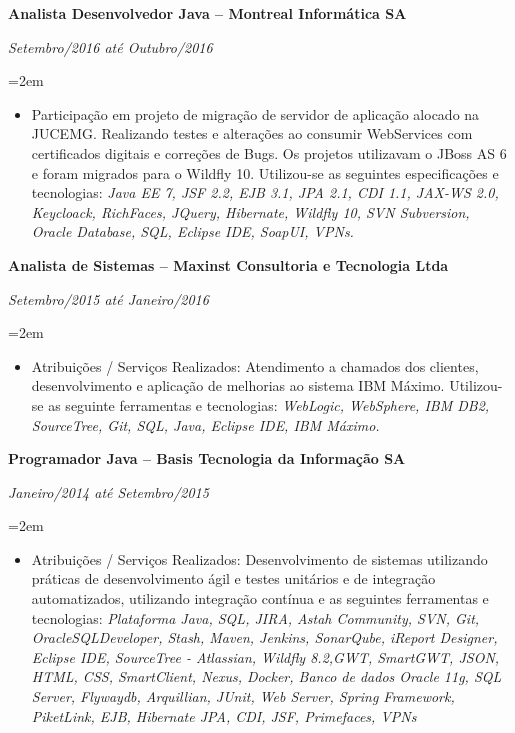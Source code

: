 \documentclass[paper=a4,fontsize=11pt]{scrartcl} %
\newcommand{\EducationEntry}[4]{
		\noindent \textbf{#1} \hfill      %
		\colorbox{White}{%
			\parbox{5cm}{%
			\hfill\color{Black}#2}} \par  %
		\noindent \textit{#3} \par        %
		\noindent\hangindent=2em\hangafter=0 \small #4 %
		\normalsize \par}
\begin{document}
\EducationEntry{Analista Desenvolvedor Java – Montreal Informática SA}{}{Setembro/2016 até Outubro/2016}{
	\begin{itemize}
		\item{Participação em projeto de migração de servidor de aplicação alocado na JUCEMG.
		Realizando testes e alterações ao consumir WebServices com certificados digitais e
		correções de Bugs. Os projetos utilizavam o JBoss AS 6 e foram migrados para o Wildfly
		10. Utilizou-se as seguintes especificações e tecnologias: \newline \newline
		      \textit{Java EE 7, JSF 2.2, EJB 3.1, JPA 2.1, CDI 1.1, JAX-WS 2.0, Keycloack, RichFaces,
			  JQuery, Hibernate, Wildfly 10, SVN Subversion, Oracle Database, SQL, Eclipse IDE,
			  SoapUI, VPNs.}}

	\end{itemize}
}

\EducationEntry{Analista de Sistemas – Maxinst Consultoria e Tecnologia Ltda}{}{Setembro/2015 até Janeiro/2016}{
	\begin{itemize}
		\item{Atribuições / Serviços Realizados: Atendimento a chamados dos clientes, desenvolvimento
		e aplicação de melhorias ao sistema IBM Máximo. Utilizou-se as seguinte ferramentas e
		tecnologias: \newline \newline
		      \textit{WebLogic, WebSphere, IBM DB2, SourceTree, Git, SQL, Java, Eclipse IDE, IBM
			  Máximo.}}

	\end{itemize}
}

\EducationEntry{Programador Java – Basis Tecnologia da Informação SA}{}{Janeiro/2014 até Setembro/2015}{
	\begin{itemize}
		\item{Atribuições / Serviços Realizados: Desenvolvimento de sistemas utilizando práticas de
		desenvolvimento ágil e testes unitários e de integração automatizados, utilizando
		integração contínua e as seguintes ferramentas e tecnologias: \newline \newline
		      \textit{Plataforma Java, SQL, JIRA, Astah Community, SVN, Git, OracleSQLDeveloper,
			  Stash, Maven, Jenkins, SonarQube, iReport Designer, Eclipse IDE, SourceTree -
			  Atlassian, Wildfly 8.2,GWT, SmartGWT, JSON, HTML, CSS, SmartClient, Nexus, Docker,
			  Banco de dados Oracle 11g, SQL Server, Flywaydb, Arquillian, JUnit, Web Server, Spring Framework,
			  PiketLink, EJB, Hibernate JPA, CDI, JSF, Primefaces, VPNs}}

	\end{itemize}
}
\end{document}
